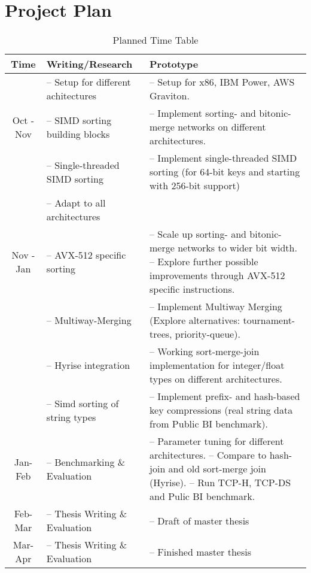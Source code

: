 \newpage
\section{Project Plan}
\label{sec:plan}


\begin{table}[h!]
    \centering
    \begin{tabular}{ | c | m{} | m{} | }
        \hline
        \textbf{Time} & \textbf{Writing/Research} & \textbf{Prototype} \\
        \hline
                      & -- Setup for different achitectures &  -- Setup for x86, IBM Power, AWS Graviton. \\
        Oct - Nov  & -- SIMD sorting building blocks & -- Implement sorting- and bitonic-merge networks on different architectures.\\ 
                   & -- Single-threaded SIMD sorting & -- Implement single-threaded SIMD sorting (for 64-bit keys and starting with 256-bit support) \\ 
                   & -- Adapt to all architectures \\
        \hline
        Nov - Jan & -- AVX-512 specific sorting & -- Scale up sorting- and bitonic-merge networks to wider bit width. \newline -- Explore further possible improvements through AVX-512 specific instructions. \\
                  & -- Multiway-Merging & -- Implement Multiway Merging (Explore alternatives: tournament-trees, priority-queue). \\    
                  & -- Hyrise integration & -- Working sort-merge-join implementation for integer/float types on different architectures.\\ 
                  & -- Simd sorting of string types & -- Implement prefix- and hash-based key compressions (real string data from Public BI benchmark).\\ 
        \hline
        Jan-Feb & -- Benchmarking \& Evaluation & -- Parameter tuning for different architectures. \newline 
                                                   -- Compare to hash-join and old sort-merge join (Hyrise). \newline
                                                   -- Run TCP-H, TCP-DS and Pulic BI benchmark. \\
        \hline
        Feb-Mar & -- Thesis Writing \& Evaluation & -- Draft of master thesis\\
        \hline
        Mar-Apr & -- Thesis Writing \& Evaluation & -- Finished master thesis \\
       \hline 
    \end{tabular}
    \caption{Planned Time Table}
    \label{tab:time-table}
\end{table}
